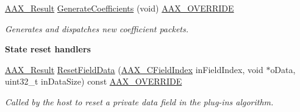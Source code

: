 \begin{Indent}
\begin{DoxyCompactItemize}
\mbox{\hyperlink{a00392_a4d8f69a697df7f70c3a8e9b8ee130d2f}{A\+A\+X\+\_\+\+Result}} \mbox{\hyperlink{a01481_a2ae4c7e4ed12f2763934da50aa5730f3}{Generate\+Coefficients}} (void) \mbox{\hyperlink{a00392_ac2f24a5172689ae684344abdcce55463}{A\+A\+X\+\_\+\+O\+V\+E\+R\+R\+I\+DE}}
\begin{DoxyCompactList}\small\item\em Generates and dispatches new coefficient packets. \end{DoxyCompactList}\end{DoxyCompactItemize}
\end{Indent}
\begin{Indent}\textbf{ State reset handlers}\par
\begin{DoxyCompactItemize}
\item 
\mbox{\hyperlink{a00392_a4d8f69a697df7f70c3a8e9b8ee130d2f}{A\+A\+X\+\_\+\+Result}} \mbox{\hyperlink{a01481_a0dd675680a657de7f9d45d65d4b3bcfb}{Reset\+Field\+Data}} (\mbox{\hyperlink{a00392_ae807f8986143820cfb5d6da32165c9c7}{A\+A\+X\+\_\+\+C\+Field\+Index}} in\+Field\+Index, void $\ast$o\+Data, uint32\+\_\+t in\+Data\+Size) const \mbox{\hyperlink{a00392_ac2f24a5172689ae684344abdcce55463}{A\+A\+X\+\_\+\+O\+V\+E\+R\+R\+I\+DE}}
\begin{DoxyCompactList}\small\item\em Called by the host to reset a private data field in the plug-\/in\textquotesingle{}s algorithm. \end{DoxyCompactList}\end{DoxyCompactItemize}
\end{Indent}
